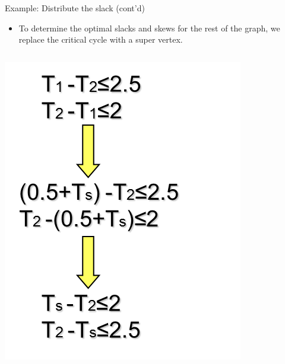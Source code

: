 \documentclass[10pt,ignorenonframetext,mathserif,onlymath]{beamer}
\providecommand{\tightlist}{%
  \setlength{\itemsep}{0pt}\setlength{\parskip}{0pt}}
\begin{document}
\begin{frame}{Example: Distribute the slack (cont’d)}
\protect\hypertarget{example-distribute-the-slack-contd}{}

\begin{itemize}
\tightlist
\item
  To determine the optimal slacks and skews for the rest of the graph,
  we replace the critical cycle with a super vertex.
\end{itemize}

\begin{columns}

\pause
{}

\pause
{}

\includegraphics{lec05.files/fig13.png}\\
\end{columns}

\end{frame}
\end{document}
